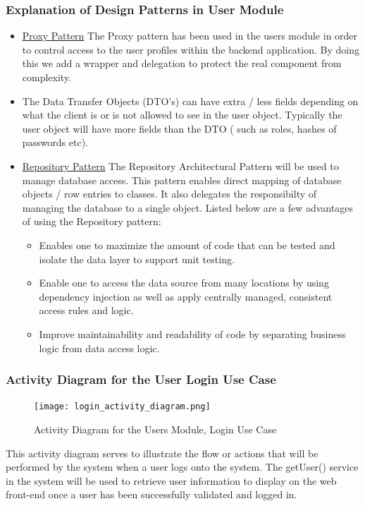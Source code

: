 \documentclass[runningheads,a4paper]{article}
\begin{document}
\subsubsection {Explanation of Design Patterns in User Module}
\begin{itemize}
\item \underline{Proxy Pattern} The Proxy pattern has been used in the users module in order to control access to the user profiles within the backend application. By doing this we add a wrapper and delegation to protect the real component from complexity. 

\item The Data Transfer Objects (DTO's)  can have extra / less fields depending on what the client is or is not allowed to see in the user object. Typically the user object will have more fields than the DTO ( such as roles, hashes of passwords etc). 

\item \underline{Repository Pattern} The Repository Architectural Pattern will be used to manage database access. This pattern enables direct mapping of database objects / row entries to classes. It also delegates the responsibilty of managing the database to a single object. Listed below are a few advantages of using the Repository pattern:
	\begin{itemize}
		\item Enables one to maximize the amount of code that can be tested and isolate the data layer to support unit testing. 
		\item Enable one to access the data source from many locations by using dependency injection as well as apply centrally managed, consistent access rules and logic.
		\item Improve maintainability and readability of code by separating business logic from data access logic.  
	\end{itemize} 
\end{itemize}
\subsubsection {Activity Diagram for the User Login Use Case}
 	\begin{figure}[H]
   	\centering
   	\texttt{[image: login\_activity\_diagram.png]}
   	\caption{Activity Diagram for the Users Module, Login Use Case}
	\end{figure}
	
	This activity diagram serves to illustrate the flow or actions that will be performed by the system when a user logs onto the system. The getUser() service in the system will be used to retrieve user information to display on the web front-end once a user has been successfully validated and logged in. 
\end{document}
